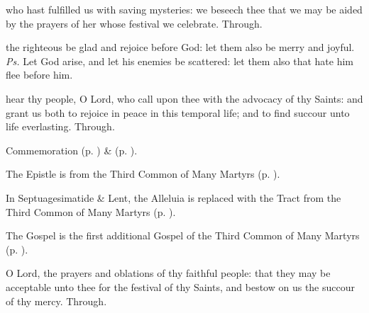 \postcommunion\label{PriscaPostcommunion}
 who hast fulfilled us with saving mysteries: we beseech thee that we may be aided by the prayers of her whose festival we celebrate. Through.




\introit
{} the righteous be glad and rejoice before God: let them also be merry and joyful. \textit{Ps.} Let God arise, and let his enemies be scattered: let them also that hate him flee before him.

\collect\label{MariusEtcCollect}
 hear thy people, O Lord, who call upon thee with the advocacy of thy Saints: and grant us both to rejoice in peace in this temporal life; and to find succour unto life everlasting. Through.

\begin{rubric}
    Commemoration  (p. \pageref{EphesianCollect}) \&  (p. \pageref{SPMaryPostChristmas}).
\end{rubric}

\begin{rubric}
	The Epistle is from the Third Common of Many Martyrs (p. \pageref{CommonMartyrsIIIEpistle}).
\end{rubric}

\clearpage
{}

\begin{rubric}
	In Septuagesimatide \& Lent, the Alleluia is replaced with the Tract from the Third Common of Many Martyrs (p. \pageref{CommonMartyrsIII}).
\end{rubric}

\begin{rubric}
	The Gospel is the first additional Gospel of the Third Common of Many Martyrs (p. \pageref{Matthew243}).
\end{rubric}


\secret\label{MariusEtcSecret}
 O Lord, the prayers and oblations of thy faithful people: that they may be acceptable unto thee for the festival of thy Saints, and bestow on us the succour of thy mercy. Through.

